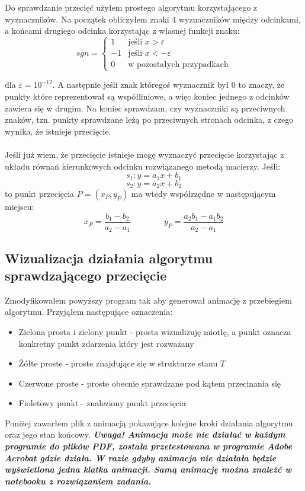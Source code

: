 \documentclass[a4paper]{article}
\begin{document}
    Do sprawdzanie przecięć użyłem prostego algorytmu korzystającego z wyznaczników. Na początek obliczyłem 
    znaki 4 wyznaczników między odcinkami, a końcami drugiego odcinka korzystając z własnej funkcji znaku:
    \[
        sgn = \left\{ 
            \begin{array}{ll}
                1 & \mbox{jeśli } x > \varepsilon \\
                -1 & \mbox{jeśli } x < -\varepsilon \\
                0 & \mbox{w pozostałych przypadkach}
            \end{array}
        \right. 
    \]

    dla $\varepsilon = 10^{-12}$. A następnie jeśli znak któregoś wyznacznik był 0 to znaczy, że punkty które reprezentował
    są współliniowe, a więc koniec jednego z odcinków zawiera się w drugim. Na koniec sprawdzam, czy wyznaczniki są
    przeciwnych znaków, tzn. punkty sprawdzane leżą po przeciwnych stronach odcinka, z czego wynika, że istnieje przecięcie.
    \\\\
    Jeśli już wiem, że przecięcie istnieje mogę wyznaczyć przecięcie korzystając z układu równań kierunkowych odcinku
    rozwiązanego metodą macierzy. Jeśli:
    \[s_1: y = a_1x+b_1\]
    \[s_2: y = a_2x+b_2\]
    to punkt przecięcia $P = (x_P, y_P)$ ma wtedy współrzędne w następującym miejscu:
    \[
        x_P = \frac{b_1 - b_2}{a_2 - a_1}
        \qquad \qquad
        y_P = \frac{a_2b_1 - a_1b_2}{a_2 - a_1}
    \]  

\subsection{Wizualizacja działania algorytmu sprawdzającego przecięcie}
    Zmodyfikowałem powyższy program tak aby generował animację z przebiegiem algorytmu. Przyjąłem następujące
    oznaczenia:
    \begin{itemize}
        \item Zielona prosta i zielony punkt - prosta wizualizuję miotłę, a punkt oznacza konkretny punkt zdarzenia który jest rozważany
        \item Żółte proste - proste znajdujące się w strukturze stanu $T$
        \item Czerwone proste - proste obecnie sprawdzane pod kątem przecinania się 
        \item Fioletowy punkt - znaleziony punkt przecięcia 
    \end{itemize}
    Poniżej zawarłem plik z animacją pokazujące kolejne kroki działania algorytmu oraz jego stan końcowy.
    \textbf{\textit{Uwaga! Animacja może nie działać w każdym
    programie do plików PDF, została przetestowana w programie Adobe Acrobat gdzie działa.
    W razie gdyby animacja nie działała będzie wyświetlona jedna klatka animacji. Samą 
    animację można znaleźć w notebooku z rozwiązaniem zadania.}}
\end{document}
